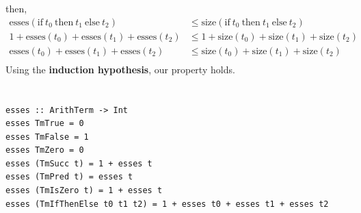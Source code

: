 \documentclass[letterpaper]{article}
\theoremstyle{plain}
\theoremstyle{definition}
\theoremstyle{remark}
\begin{document}
then,
\begin{align*}
    \text{esses}(\text{if}~t_0~\text{then}~t_1~\text{else}~t_2)&\leq\text{size}(\text{if}~t_0~\text{then}~t_1~\text{else}~t_2)\\
    1+\text{esses}(t_0)+\text{esses}(t_1)+\text{esses}(t_2)&\leq1+\text{size}(t_0)+\text{size}(t_1)+\text{size}(t_2)\\
    \text{esses}(t_0)+\text{esses}(t_1)+\text{esses}(t_2)&\leq\text{size}(t_0)+\text{size}(t_1)+\text{size}(t_2)\\
\end{align*}
Using the \textbf{induction hypothesis}, our property holds.

\section{}
\begin{verbatim}
esses :: ArithTerm -> Int
esses TmTrue = 0
esses TmFalse = 1
esses TmZero = 0
esses (TmSucc t) = 1 + esses t
esses (TmPred t) = esses t
esses (TmIsZero t) = 1 + esses t
esses (TmIfThenElse t0 t1 t2) = 1 + esses t0 + esses t1 + esses t2
\end{verbatim}
\end{document}

